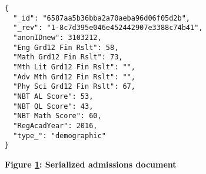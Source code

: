 \begin{figure}[H]
  \centering
  \begin{mdframed}
    \centering
    \begin{verbatim}
{
  "_id": "6587aa5b36bba2a70aeba96d06f05d2b",
  "_rev": "1-8c7d395e046e452442907e3388c74b41",
  "anonIDnew": 3103212,
  "Eng Grd12 Fin Rslt": 58,
  "Math Grd12 Fin Rslt": 73,
  "Mth Lit Grd12 Fin Rslt": "",
  "Adv Mth Grd12 Fin Rslt": "",
  "Phy Sci Grd12 Fin Rslt": 67,
  "NBT AL Score": 53,
  "NBT QL Score": 43,
  "NBT Math Score": 60,
  "RegAcadYear": 2016,
  "type_": "demographic"
}         
        \end{verbatim}
  \end{mdframed}
  \caption[Serialized admissions document]{\textbf{Figure \ref{fig-json-admission}: Serialized admissions document}}
  \label{fig-json-admission}
\end{figure}